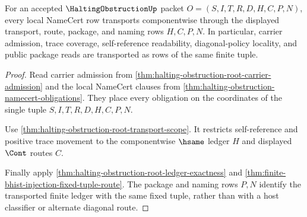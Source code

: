 \begin{theorem}
\label{thm:halting-obstruction-stdbridge-component-transport}
For an accepted $\HaltingObstructionUp$ packet $O=(S,I,T,R,D,H,C,P,N)$, every
local NameCert row transports componentwise through the displayed transport,
route, package, and naming rows $H,C,P,N$. In particular, carrier admission,
trace coverage, self-reference readability, diagonal-policy locality, and
public package reads are transported as rows of the same finite tuple.
\end{theorem}
\begin{proof}
Read carrier admission from
\autoref{thm:halting-obstruction-root-carrier-admission} and the local
NameCert clauses from \autoref{thm:halting-obstruction-namecert-obligations}.
They place every obligation on the coordinates of the single tuple
$S,I,T,R,D,H,C,P,N$.

Use \autoref{thm:halting-obstruction-root-transport-scope}. It restricts
self-reference and positive trace movement to the componentwise $\hsame$
ledger $H$ and displayed $\Cont$ routes $C$.

Finally apply \autoref{thm:halting-obstruction-root-ledger-exactness} and
\autoref{thm:finite-bhist-injection-fixed-tuple-route}. The package and naming
rows $P,N$ identify the transported finite ledger with the same fixed tuple,
rather than with a host classifier or alternate diagonal route.
\end{proof}

